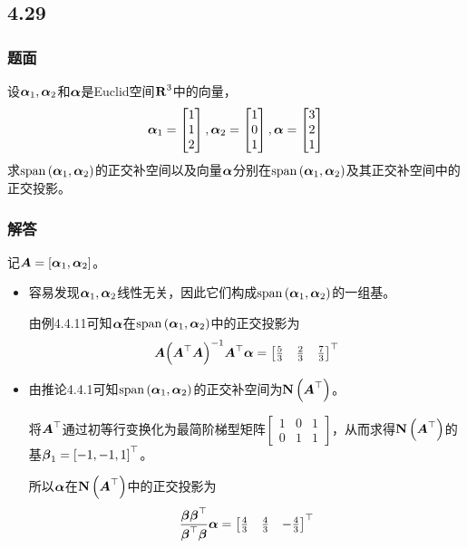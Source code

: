 \documentclass{beamer}
\begin{document}
\subsection*{4.29}
\begin{frame}
    \frametitle{题面}
    设\(\boldsymbol{\alpha}_1,\boldsymbol{\alpha}_2\)和\(\boldsymbol{\alpha}\)是Euclid空间\(\boldsymbol{\mathrm{R}}^3\)中的向量，
    \begin{equation*}
        \boldsymbol{\alpha}_1=\begin{bmatrix}1\\1\\2\end{bmatrix},
        \boldsymbol{\alpha}_2=\begin{bmatrix}1\\0\\1\end{bmatrix},
        \boldsymbol{\alpha}=\begin{bmatrix}3\\2\\1\end{bmatrix}
    \end{equation*}
    求\(\mathrm{span}\left( \boldsymbol{\alpha}_1,\boldsymbol{\alpha}_2 \right)\)的正交补空间以及向量\(\boldsymbol{\alpha}\)分别在\(\mathrm{span}\left( \boldsymbol{\alpha}_1,\boldsymbol{\alpha}_2 \right)\)及其正交补空间中的正交投影。
\end{frame}

\begin{frame}
    \frametitle{解答}
    记\(\boldsymbol{A}=\left[ \boldsymbol{\alpha}_1,\boldsymbol{\alpha}_2 \right]\)。
    \begin{itemize}
        \item {
              容易发现\(\boldsymbol{\alpha}_1,\boldsymbol{\alpha}_2\)线性无关，因此它们构成\(\mathrm{span}\left( \boldsymbol{\alpha}_1,\boldsymbol{\alpha}_2 \right)\)的一组基。

              由例4.4.11可知\(\boldsymbol{\alpha}\)在\(\mathrm{span}\left( \boldsymbol{\alpha}_1,\boldsymbol{\alpha}_2 \right)\)中的正交投影为
              \begin{equation*}
                  \boldsymbol{A}{\left( \boldsymbol{A}^\top\boldsymbol{A} \right)}^{-1}\boldsymbol{A}^\top\boldsymbol{\alpha}=\begin{bmatrix}\frac{5}{3}&\frac{2}{3}&\frac{7}{3}\end{bmatrix}^\top
              \end{equation*}
              }
        \item {
              由推论4.4.1可知\(\mathrm{span}\left( \boldsymbol{\alpha}_1,\boldsymbol{\alpha}_2 \right)\)的正交补空间为\(\boldsymbol{\mathrm{N}}\left( \boldsymbol{A}^\top \right)\)。

              将\(\boldsymbol{A}^\top\)通过初等行变换化为最简阶梯型矩阵\(\begin{bmatrix}1 & 0 & 1 \\0 & 1 & 1\end{bmatrix}\)，从而求得\(\boldsymbol{\mathrm{N}}\left( \boldsymbol{A}^\top \right)\)的基\(\boldsymbol{\beta}_1=\left[ -1,-1,1 \right]^\top\)。

              所以\(\boldsymbol{\alpha}\)在\(\boldsymbol{\mathrm{N}}\left( \boldsymbol{A}^\top \right)\)中的正交投影为
              \begin{equation*}
                  \frac{\boldsymbol{\beta}\boldsymbol{\beta}^\top}{\boldsymbol{\beta}^\top\boldsymbol{\beta}}\boldsymbol{\alpha}=\begin{bmatrix}\frac{4}{3}&\frac{4}{3}&-\frac{4}{3}\end{bmatrix}^\top
              \end{equation*}
              }
    \end{itemize}
\end{frame}
\end{document}
